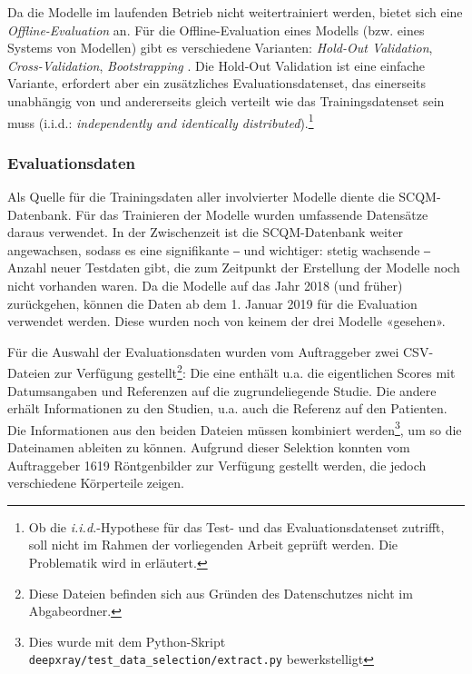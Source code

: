 Da die Modelle im laufenden Betrieb nicht weitertrainiert werden, bietet sich eine \textit{Off\-line-Evaluation} an. Für die Offline-Evaluation eines Modells (bzw. eines Systems von Modellen) gibt es verschiedene Varianten: \textit{Hold-Out Validation}, \textit{Cross-Validation}, \textit{Bootstrapping} \cite[S. 19]{zheng2015}. Die Hold-Out Validation ist eine einfache Variante, erfordert aber ein zusätzliches Evaluationsdatenset, das einerseits unabhängig von und andererseits gleich verteilt wie das Trainingsdatenset sein muss (i.i.d.: \textit{independently and identically distributed}).\footnote{Ob die \textit{i.i.d.}-Hypothese für das Test- und das Evaluationsdatenset zutrifft, soll nicht im Rahmen der vorliegenden Arbeit geprüft werden. Die Problematik wird in  erläutert.}

\subsubsection{Evaluationsdaten}
\label{sec:evaluationsdaten}

Als Quelle für die Trainingsdaten aller involvierter Modelle diente die SCQM-Datenbank. Für das Trainieren der Modelle wurden umfassende Datensätze daraus verwendet. In der Zwischenzeit ist die SCQM-Datenbank weiter angewachsen, sodass es eine signifikante ‒ und wichtiger: stetig wachsende ‒ Anzahl neuer Testdaten gibt, die zum Zeitpunkt der Erstellung der Modelle noch nicht vorhanden waren. Da die Modelle auf das Jahr 2018 (und früher) zurückgehen, können die Daten ab dem 1. Januar 2019 für die Evaluation verwendet werden. Diese wurden noch von keinem der drei Modelle «gesehen».

Für die Auswahl der Evaluationsdaten wurden vom Auftraggeber zwei CSV-Dateien zur Verfügung gestellt\footnote{Diese Dateien befinden sich aus Gründen des Datenschutzes nicht im Abgabeordner.}: Die eine enthält u.a. die eigentlichen Scores mit Datumsangaben und Referenzen auf die zugrundeliegende Studie. Die andere erhält Informationen zu den Studien, u.a. auch die Referenz auf den Patienten. Die Informationen aus den beiden Dateien müssen kombiniert werden\footnote{Dies wurde mit dem Python-Skript \texttt{deepxray/test\_data\_selection/extract.py} bewerkstelligt}, um so die Dateinamen ableiten zu können. Aufgrund dieser Selektion konnten vom Auftraggeber 1619 Röntgenbilder zur Verfügung gestellt werden, die jedoch verschiedene Körperteile zeigen.

